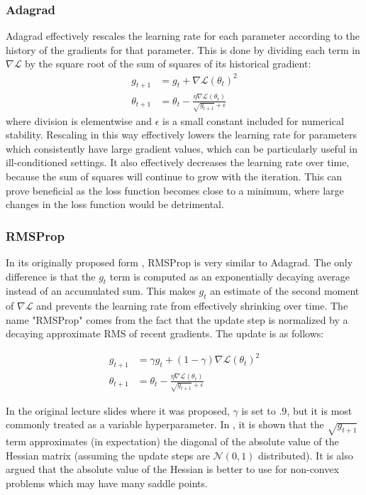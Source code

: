 \subsubsection{Adagrad}

Adagrad \cite{duchi2011adaptive} effectively rescales the learning rate for each parameter according to the history of the gradients for that parameter.
This is done by dividing each term in $\nabla \mathcal{L}$ by the square root of the sum of squares of its historical gradient:
\begin{align}
g_{t + 1} &= g_t + \nabla \mathcal{L}(\theta_t)^2 \\
\theta_{t + 1} &= \theta_t - \frac{\eta\nabla \mathcal{L}(\theta_t)}{\sqrt{g_{t + 1}} + \epsilon}
\end{align}
where division is elementwise and $\epsilon$ is a small constant included for numerical stability.
Rescaling in this way effectively lowers the learning rate for parameters which consistently have large gradient values, which can be particularly useful in ill-conditioned settings.
It also effectively decreases the learning rate over time, because the sum of squares will continue to grow with the iteration.
This can prove beneficial as the loss function becomes close to a minimum, where large changes in the loss function would be detrimental.

\subsubsection{RMSProp}

In its originally proposed form \cite{tieleman2012lecture}, RMSProp is very similar to Adagrad.
The only difference is that the $g_t$ term is computed as an exponentially decaying average instead of an accumulated sum.
This makes $g_t$ an estimate of the second moment of $\nabla \mathcal{L}$ and prevents the learning rate from effectively shrinking over time.
The name "RMSProp" comes from the fact that the update step is normalized by a decaying approximate RMS of recent gradients.
The update is as follows:

\begin{align}
g_{t + 1} &= \gamma g_t + (1 - \gamma) \nabla \mathcal{L}(\theta_t)^2 \\
\theta_{t + 1} &= \theta_t - \frac{\eta\nabla \mathcal{L}(\theta_t)}{\sqrt{g_{t + 1}} + \epsilon}
\end{align}

In the original lecture slides where it was proposed, $\gamma$ is set to $.9$, but it is most commonly treated as a variable hyperparameter.
In \cite{dauphin2015rmsprop}, it is shown that the $\sqrt{g_{t + 1}}$ term approximates (in expectation) the diagonal of the absolute value of the Hessian matrix (assuming the update steps are $\mathcal{N}(0, 1)$ distributed).
It is also argued that the absolute value of the Hessian is better to use for non-convex problems which may have many saddle points.

